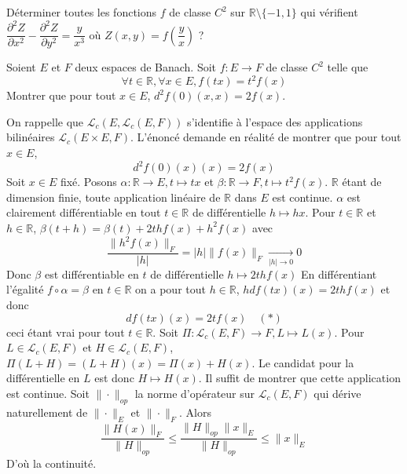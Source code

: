 \documentclass{fancybook}
\begin{document}
\begin{exercice}
Déterminer toutes les fonctions $f$ de classe $C^2$ sur $\mathbb R\setminus \{-1,1\}$ qui vérifient $\dfrac{\partial^2 Z}{\partial x^2}-\dfrac{\partial^2 Z}{\partial y^2}=\dfrac{y}{x^3}$ où $Z(x,y)=f(\dfrac{y}{x})$ ? 
\end{exercice}


\begin{exercice}
Soient $E$ et $F$ deux espaces de Banach. Soit $f:E\to F$ de classe $C^2$ telle que $$\forall t \in \mathbb R, \forall x\in E, f(tx)=t^2f(x)$$
Montrer que pour tout $x\in E$, $d^2f(0)(x,x)=2f(x)$.
\end{exercice}
On rappelle que $\mathcal L_c(E,\mathcal L_c(E,F))$ s'identifie à l'espace des applications bilinéaires $\mathcal L_c(E\times E, F)$.\newline
L'énoncé demande en réalité de montrer que pour tout $x\in E$, $$d^2f(0)(x)(x)=2f(x)$$
Soit $x\in E$ fixé. \newline 
Posons $\alpha:\mathbb R\to E, t\mapsto tx$ et $\beta: \mathbb R\to F, t\mapsto t^2f(x)$. $\mathbb R$ étant de dimension finie, toute application linéaire de $\mathbb R$ dans $E$ est continue. $\alpha$ est clairement différentiable en tout $t\in \mathbb R$ de différentielle $h\mapsto hx$.\newline 
Pour $t\in \mathbb R$ et $h\in \mathbb R$, $\beta(t+h)=\beta(t)+2thf(x)+h^2f(x)$ avec $$\dfrac{\|h^2f(x)\|_F}{|h|}=|h|\|f(x)\|_F \xrightarrow[|h|\to 0]{}0 $$
Donc $\beta$ est différentiable en $t$ de différentielle $h\mapsto 2thf(x) $ \newline \newline
En différentiant l'égalité $f\circ \alpha =\beta $ en $t\in \mathbb R$ on a pour tout $h\in \mathbb R$, $hdf(tx)(x)=2thf(x)$ et donc $$df(tx)(x)=2tf(x) \quad (*)$$
ceci étant vrai pour tout $t\in \mathbb R$.\newline 
Soit $\Pi:\mathcal L_c(E,F)\to F, L\mapsto L(x)$. Pour $L\in \mathcal L_c(E,F)$ et $H\in \mathcal L_c(E,F)$, $\Pi(L+H)=(L+H)(x)=\Pi(x)+H(x)$.\newline
Le candidat pour la différentielle en $L$ est donc $H\mapsto H(x)$. Il suffit de montrer que cette application est continue.\newline
Soit $\|\cdot\|_{op}$ la norme d'opérateur sur $\mathcal L_c(E,F)$ qui dérive naturellement de $\|\cdot\|_E$ et $\|\cdot\|_F$.\newline
Alors $$ \dfrac{\|H(x)\|_F}{\|H\|_{op}}\leq \dfrac{\|H\|_{op}\|x\|_E}{\|H\|_{op}}\leq\|x\|_E $$
D'où la continuité. \newline \newline
\end{document}
